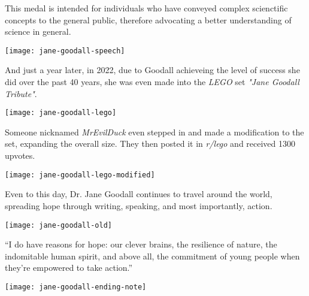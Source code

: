 \documentclass[12pt]{report}
\begin{document}
This medal is intended for individuals who have conveyed complex scienctific
concepts to the general public, therefore advocating a better understanding of
science in general.

\texttt{[image: jane-goodall-speech]}

\pagebreak

And just a year later, in 2022, due to Goodall achieveing the level of success
she did over the past 40 years, she was even made into the \textit{LEGO} set
\textit{"Jane Goodall Tribute"}.

\texttt{[image: jane-goodall-lego]}

Someone nicknamed \textit{MrEvilDuck} even stepped in and made a modification
to the set, expanding the overall size. They then posted it in \textit{r/lego}
and received 1300 upvotes.

\texttt{[image: jane-goodall-lego-modified]}

\pagebreak

Even to this day, Dr. Jane Goodall continues to travel around the world,
spreading hope through writing, speaking, and most importantly, action.

\texttt{[image: jane-goodall-old]}

“I do have reasons for hope: our clever brains, the resilience of nature, the
indomitable human spirit, and above all, the commitment of young people when
they’re empowered to take action.”

\texttt{[image: jane-goodall-ending-note]}
\end{document}
